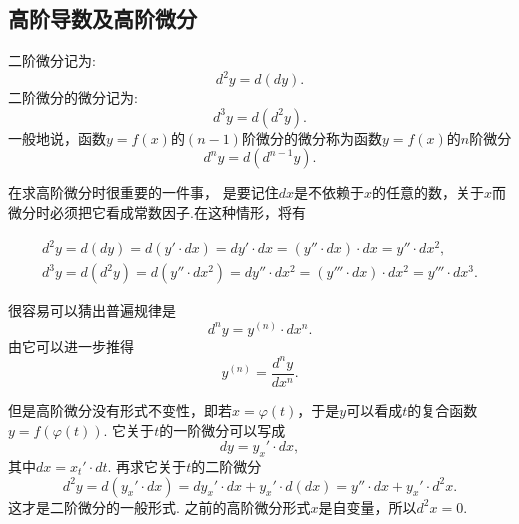 \documentclass{article}
\begin{document}
\subsection{高阶导数及高阶微分}

二阶微分记为:\[d^2 y =d(dy).\]二阶微分的微分记为:\[d^3 y = d(d^2 y).\]一般地说，函数$y=f(x)$的$(n-1)$阶微分的微分称为函数$y=f(x)$的$n$阶微分\[d^n y  = d(d^{n-1} y).\]

在求高阶微分时很重要的一件事，{\color{red} 是要记住$dx$是不依赖于$x$的任意的数，关于$x$而微分时必须把它看成常数因子}.在这种情形，将有

\begin{align*}
	d^2 y = d(dy) = d(y' \cdot dx) = dy' \cdot dx = (y'' \cdot dx) \cdot dx = y'' \cdot dx^2, \\
	d^3 y = d(d^2 y) = d(y'' \cdot dx^2) =dy'' \cdot dx^2 = (y'''\cdot dx)\cdot dx^2 = y''' \cdot dx^3.
\end{align*}

很容易可以猜出普遍规律是\[d^n y = y^{(n)} \cdot dx^n.\]由它可以进一步推得\[y^{(n)} = \frac{d^n y}{d x^n}.\]

{\color{blue} 但是高阶微分没有形式不变性}，即若$x = \varphi(t)$，于是$y$可以看成$t$的复合函数$y = f(\varphi(t))$. 它关于$t$的一阶微分可以写成\[dy =y_x' \cdot dx,\]其中$dx = x_t' \cdot dt$. 再求它关于$t$的二阶微分\[d^2 y = d(y_x' \cdot dx) = dy_x' \cdot dx + y_x' \cdot d(dx) = y'' \cdot dx + y_x' \cdot d^2 x.\]这才是二阶微分的一般形式. 之前的高阶微分形式$x$是自变量，所以$d^2 x = 0$.
\end{document}
